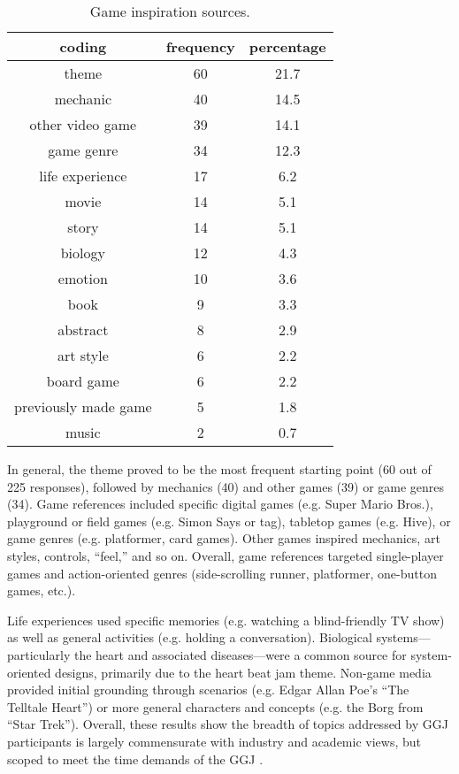 \documentclass{sig-alternate}
\begin{document}
\begin{table}[tb]
\centering
\scriptsize
\begin{tabular}{|c|c|c|}
\hline coding & frequency & percentage \\ 
\hline theme & 60 & 21.7 \\ 
\hline mechanic & 40 & 14.5 \\ 
\hline other video game & 39 & 14.1  \\ 
\hline game genre & 34 & 12.3 \\ 
\hline life experience & 17 & 6.2 \\ 
\hline movie & 14 & 5.1 \\ 
\hline story & 14 & 5.1 \\ 
\hline biology & 12 & 4.3 \\ 
\hline emotion & 10 & 3.6 \\ 
\hline book & 9 & 3.3 \\ 
\hline abstract & 8 & 2.9 \\ 
\hline art style & 6 & 2.2 \\ 
\hline board game & 6 & 2.2 \\ 
\hline previously made game & 5 & 1.8 \\ 
\hline music & 2 & 0.7 \\ 
\hline 
\end{tabular}
\caption{Game inspiration sources.}
\label{tab:inspiration}
\end{table}

In general, the theme proved to be the most frequent starting point (60 out of 225 responses), followed by mechanics (40) and other games (39) or game genres (34).
Game references included specific digital games (e.g. Super Mario Bros.), playground or field games (e.g. Simon Says or tag), tabletop games (e.g. Hive), or game genres (e.g. platformer, card games). Other games inspired mechanics, art styles, controls, ``feel,'' and so on. 
Overall, game references targeted single-player games and action-oriented genres (side-scrolling runner, platformer, one-button games, etc.).

Life experiences used specific memories (e.g. watching a blind-friendly TV show) as well as general activities (e.g. holding a conversation).
Biological systems---particularly the heart and associated diseases---were a common source for system-oriented designs, primarily due to the heart beat jam theme.
Non-game media provided initial grounding through scenarios (e.g. Edgar Allan Poe's ``The Telltale Heart'') or more general characters and concepts (e.g. the Borg from ``Star Trek'').
Overall, these results show the breadth of topics addressed by GGJ participants is largely commensurate with industry and academic views, but scoped to meet the time demands of the GGJ \cite{bogost2011:howto}.
\end{document}
